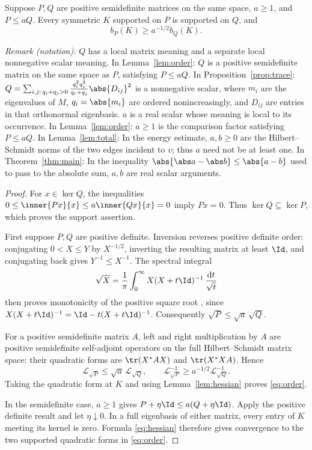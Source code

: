 \begin{lemma}\label{lem:order}
Suppose \(P,Q\) are positive semidefinite matrices on the same space,
\(a\ge1\), and \(P\le aQ\). Every symmetric \(K\) supported on \(P\)
is supported on \(Q\), and
\begin{equation}\label{eq:order}
 b_P(K)\ge a^{-1/2}b_Q(K).
\end{equation}
\end{lemma}

\noindent\textit{Remark (notation).} $Q$ has a local matrix meaning and a separate local nonnegative scalar meaning. In Lemma~\ref{lem:order}: $Q$ is a positive semidefinite matrix on the same space as $P$, satisfying $P\le aQ$. In Proposition~\ref{prop:trace}: $Q=\sum_{i,j:\,q_i+q_j>0}\frac{q_i^2q_j^2}{q_i+q_j}\abs{D_{ij}}^2$ is a nonnegative scalar, where $m_i$ are the eigenvalues of $M$, $q_i=\abs{m_i}$ are ordered nonincreasingly, and $D_{ij}$ are entries in that orthonormal eigenbasis. $a$ is a real scalar whose meaning is local to its occurrence. In Lemma~\ref{lem:order}: $a\ge1$ is the comparison factor satisfying $P\le aQ$. In Lemma~\ref{lem:total}: In the energy estimate, $a,b\ge0$ are the Hilbert--Schmidt norms of the two edges incident to $v$; thus $a$ need not be at least one. In Theorem~\ref{thm:main}: In the inequality $\abs{\abs a-\abs b}\le\abs{a-b}$ used to pass to the absolute sum, $a,b$ are real scalar arguments.


\begin{proof}
For \(x\in\ker Q\), the inequalities
\(0\le\inner{Px}{x}\le a\inner{Qx}{x}=0\) imply \(Px=0\).
Thus \(\ker Q\subseteq\ker P\), which proves the support assertion.

First suppose \(P,Q\) are positive definite. Inversion reverses
positive definite order: conjugating \(0<X\le Y\) by \(X^{-1/2}\),
inverting the resulting matrix at least \(\Id\), and conjugating back
gives \(Y^{-1}\le X^{-1}\). The spectral integral
\[
 \sqrt X=\frac1\pi\int_0^\infty
        X(X+t\Id)^{-1}\,\frac{\mathrm dt}{\sqrt t}
\]
then proves monotonicity of the positive square root
\cite[Theorem, p.~309]{Pedersen1972}, since
\(X(X+t\Id)^{-1}=\Id-t(X+t\Id)^{-1}\). Consequently
\(\sqrt P\le\sqrt a\,\sqrt Q\).

For a positive semidefinite matrix \(A\), left and right multiplication
by \(A\) are positive semidefinite self-adjoint operators on the full
Hilbert--Schmidt matrix space: their quadratic forms are
\(\tr(X^*AX)\) and \(\tr(X^*XA)\). Hence
\[
 \mathcal L_{\sqrt P}\le\sqrt a\,\mathcal L_{\sqrt Q},
 \qquad
 \mathcal L_{\sqrt P}^{-1}
       \ge a^{-1/2}\mathcal L_{\sqrt Q}^{-1}.
\]
Taking the quadratic form at \(K\) and using Lemma~\ref{lem:hessian}
proves \eqref{eq:order}.

In the semidefinite case, \(a\ge1\) gives
\(P+\eta\Id\le a(Q+\eta\Id)\). Apply the positive definite result
and let \(\eta\downarrow0\). In a full eigenbasis of either matrix,
every entry of \(K\) meeting its kernel is zero. Formula
\eqref{eq:hessian} therefore gives convergence to the two supported
quadratic forms in \eqref{eq:order}.
\end{proof}

